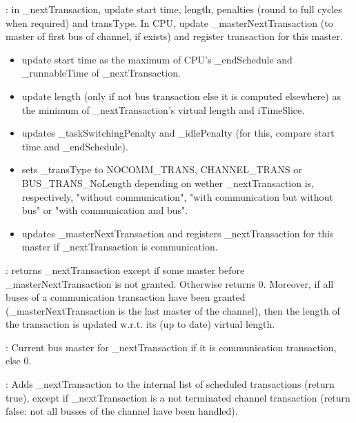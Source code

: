 \documentclass[a4paper,11pt]{article}
\newcommand{\bfont}{\fontseries{b}\selectfont}
\newcommand{\cod}[1]{{\ttfamily #1}}
\newcommand{\method}[1]{\par\vspace{1mm}\hspace{-2mm}\colorbox{method}{\textopenbullet\bfont\cod{#1}:}}
\newcommand{\variable}[1]{\par\vspace{1mm}\hspace{-2mm}\colorbox{variable}{\textopenbullet\bfont\cod{#1}:}}
\begin{document}
\method{calcStartTimeLength(iTimeSlice)} in \cod{\_nextTransaction}, update start time, length, penalties (round to full cycles when required) and transType. In CPU, update \cod{\_masterNextTransac\-tion} (to master of first bus of channel, if exists) and register transaction for this master. 
\begin{itemize}
\item update start time as the maximum of CPU's \cod{\_endSchedule} and \cod{\_runnableTime} of \cod{\_nextTransaction}.
\item update length (only if not bus transaction else it is computed elsewhere) as the minimum of \cod{\_nextTransaction}'s virtual length and \cod{iTimeSlice}.
\item updates \cod{\_taskSwitchingPenalty} and \cod{\_idlePenalty} (for this, compare start time and \cod{\_endSchedule}).
\item sets \cod{\_transType} to \cod{NOCOMM\_TRANS}, \cod{CHANNEL\_TRANS} or \cod{BUS\_TRANS\_NoLength} depending on wether \cod{\_nextTransaction} is, respectively, "without communication", "with communication but without bus" or "with communication and bus".
\item updates \cod{\_masterNextTransaction} and registers \cod{\_nextTransaction} for this master if \cod{\_nextTransaction} is communication. 
\end{itemize}

\method{getNextTransaction} returns \cod{\_nextTransaction} except if some master before \cod{\_mas\-terNextTransaction} is not granted. Otherwise returns 0. Moreover, if all buses of a communication transaction have been granted (\cod{\_mas\-terNextTransaction} is the last master of the channel), then the length of the transaction is updated w.r.t. its (up to date) virtual length.

\variable{\_masterNextTransaction} Current bus master for \cod{\_nextTransaction} if it is communication transaction, else 0.

\method{addTransaction} Adds \cod{\_nextTransaction} to the internal list of scheduled transactions (return true), except if \cod{\_nextTransaction} is a not terminated channel transaction (return false: not all busses of the channel have been handled).
\end{document}
